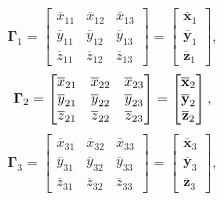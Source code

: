 \begin{itemize}
        \begin{equation}
            \mathbf{\Gamma}_{1}
            = \begin{bmatrix}
                \overline{x}_{11} & \overline{x}_{12} & \overline{x}_{13}\\
                \overline{y}_{11} & \overline{y}_{12} & \overline{y}_{13}\\
                \overline{z}_{11} & \overline{z}_{12} & \overline{z}_{13}
            \end{bmatrix}
            = \begin{bmatrix}
                \overline{\mathbf{x}}_{1}\\
                \overline{\mathbf{y}}_{1}\\
                \overline{\mathbf{z}}_{1}
            \end{bmatrix}
        ,\end{equation}
        \begin{equation}
            \mathbf{\Gamma}_{2}
            = \begin{bmatrix}
                \overline{x}_{21} & \overline{x}_{22} & \overline{x}_{23}\\
                \overline{y}_{21} & \overline{y}_{22} & \overline{y}_{23}\\
                \overline{z}_{21} & \overline{z}_{22} & \overline{z}_{23}
            \end{bmatrix}
            = \begin{bmatrix}
                \overline{\mathbf{x}}_{2}\\
                \overline{\mathbf{y}}_{2}\\
                \overline{\mathbf{z}}_{2}
            \end{bmatrix} \\
        ,\end{equation}
        \begin{equation}
            \mathbf{\Gamma}_{3}
            = \begin{bmatrix}
                \overline{x}_{31} & \overline{x}_{32} & \overline{x}_{33}\\
                \overline{y}_{31} & \overline{y}_{32} & \overline{y}_{33}\\
                \overline{z}_{31} & \overline{z}_{32} & \overline{z}_{33}
            \end{bmatrix}
            = \begin{bmatrix}
                \overline{\mathbf{x}}_{3}\\
                \overline{\mathbf{y}}_{3}\\
                \overline{\mathbf{z}}_{3}
            \end{bmatrix}
        ,\end{equation}


\end{itemize}

